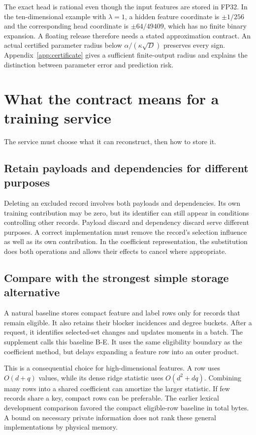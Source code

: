 The exact head is rational even though the input features are stored in
FP32. In the ten-dimensional example with $\lambda=1$, a hidden feature
coordinate is $\pm1/256$ and the corresponding head coordinate is
$\pm64/49409$, which has no finite binary expansion. A floating release
therefore needs a stated approximation contract. An actual certified
parameter radius below $\alpha/(\kappa\sqrt D)$ preserves every sign.
Appendix~\ref{app:certificate} gives a sufficient finite-output radius
and explains the distinction between parameter error and prediction risk.

\section{What the contract means for a training service}\label{sec:contracts}
The service must choose what it can reconstruct, then how to store it.

\subsection{Retain payloads and dependencies for different purposes}
Deleting an excluded record involves both payloads and dependencies.
Its own training contribution may be zero, but its identifier can still
appear in conditions controlling other records. Payload discard and
dependency discard serve different purposes. A correct implementation
must remove the record's selection influence as well as its own
contribution. In the coefficient representation, the substitution does
both operations and allows their effects to cancel where appropriate.

\subsection{Compare with the strongest simple storage alternative}
A natural baseline stores compact feature and label rows only for records
that remain eligible. It also retains their blocker incidences and degree
buckets. After a request, it identifies selected-set changes and updates
moments in a batch. The supplement calls this baseline B-E. It uses the
same eligibility boundary as the coefficient method, but delays expanding
a feature row into an outer product.

This is a consequential choice for high-dimensional features. A row uses
$O(d+q)$ values, while its dense ridge statistic uses $O(d^2+dq)$.
Combining many rows into a shared coefficient can amortize the larger
statistic. If few records share a key, compact rows can be preferable.
The earlier lexical development comparison favored the compact eligible-row
baseline in total bytes. A bound on necessary private information does
not rank these general implementations by physical memory.

